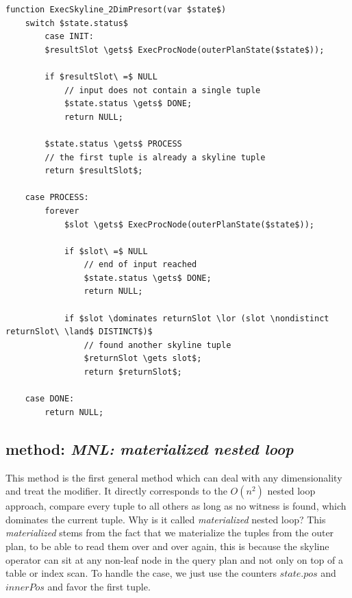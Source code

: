 \pagebreak[4]
\begin{lstlisting}[language=pseudo,
caption={Special case: 2 dimensional with presort},
label={code:2dimpresort}
]
function ExecSkyline_2DimPresort(var $state$)
	switch $state.status$
        case INIT:
		$resultSlot \gets$ ExecProcNode(outerPlanState($state$));

		if $resultSlot\ =$ NULL
			// input does not contain a single tuple
			$state.status \gets$ DONE;
			return NULL;

		$state.status \gets$ PROCESS
		// the first tuple is already a skyline tuple
		return $resultSlot$;

	case PROCESS:
		forever
			$slot \gets$ ExecProcNode(outerPlanState($state$));

			if $slot\ =$ NULL
				// end of input reached
				$state.status \gets$ DONE;
				return NULL;

			if $slot \dominates returnSlot \lor (slot \nondistinct returnSlot\ \land$ DISTINCT$)$
				// found another skyline tuple
				$returnSlot \gets slot$;
				return $returnSlot$;

	case DONE:
		return NULL;
\end{lstlisting}

\subsection{\Naive method: \emph{MNL: materialized nested loop}}
\label{sec:mnl}
This method is the first general method which can deal with any
dimensionality and treat the  modifier.  It
directly corresponds to the \naive $O(n^2)$ nested loop approach,
compare every tuple to all others as long as no witness is found, which
dominates the current tuple.  Why is it called \emph{materialized}
nested loop?  This \emph{materialized} stems from the fact that we
materialize the tuples from the outer plan, to be able to read them
over and over again, this is because the skyline operator can sit at
any non-leaf node in the query plan and not only on top of a table or
index scan.  To handle the  case, we just use
the counters $state.pos$ and $innerPos$ and favor the first tuple.

